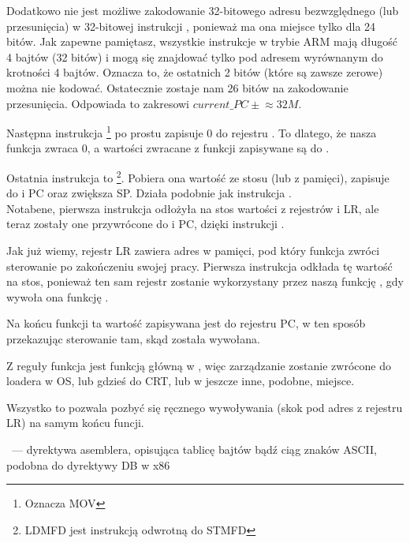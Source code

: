 Dodatkowo nie jest możliwe zakodowanie 32-bitowego adresu bezwzględnego (lub przesunięcia) w 32-bitowej instrukcji , ponieważ ma ona miejsce tylko dla 24 bitów.
Jak zapewne pamiętasz, wszystkie instrukcje w trybie ARM mają długość 4 bajtów (32 bitów) i mogą się znajdować tylko pod adresem wyrównanym do krotności 4 bajtów.
Oznacza to, że ostatnich 2 bitów (które są zawsze zerowe) można nie kodować.
Ostatecznie zostaje nam 26 bitów na zakodowanie przesunięcia. Odpowiada to zakresowi $current\_PC \pm{} \approx{}32M$.

Następna instrukcja \footnote{Oznacza MOV}
po prostu zapisuje 0 do rejestru .
To dlatego, że nasza funkcja zwraca 0, a wartości zwracane z funkcji zapisywane są do .

Ostatnia instrukcja to \footnote{\ac{LDMFD} jest instrukcją odwrotną do \ac{STMFD}}.
Pobiera ona wartość ze stosu (lub z pamięci), zapisuje do  i \ac{PC} oraz zwiększa  \ac{SP}. Działa podobnie jak instrukcja \POP.\\
Notabene, pierwsza instrukcja  odłożyła na stos wartości z rejestrów  i \ac{LR}, ale teraz zostały one przywrócone do  i \ac{PC}, dzięki instrukcji .

Jak już wiemy, rejestr \ac{LR} zawiera adres w pamięci, pod który funkcja zwróci sterowanie po zakończeniu swojej pracy.
Pierwsza instrukcja odkłada tę wartość na stos, ponieważ ten sam rejestr zostanie wykorzystany przez naszą funkcję \main, gdy wywoła ona funkcję \printf.

Na końcu funkcji ta wartość zapisywana jest do rejestru \ac{PC}, w ten sposób przekazując sterowanie tam, skąd została wywołana.

Z reguły funkcja \main jest funkcją główną w \CCpp, więc zarządzanie zostanie zwrócone do loadera w \ac{OS}, lub gdzieś do \ac{CRT}, lub w jeszcze inne, podobne, miejsce.

Wszystko to pozwala pozbyć się ręcznego wywoływania  (skok pod adres z rejestru \ac{LR}) na samym końcu funcji.

~--- dyrektywa asemblera, opisująca tablicę bajtów bądź ciąg znaków ASCII, podobna do dyrektywy DB w x86


